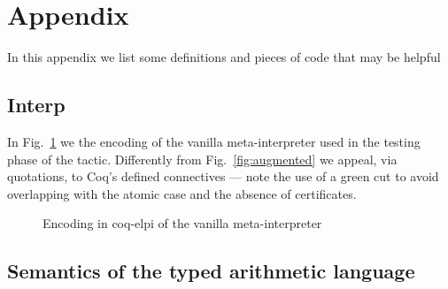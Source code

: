 
\section{Appendix}
\label{sec:app}

In this appendix we list some definitions and pieces of code that may be helpful

\subsection{Interp}


In Fig.~\ref{fig:interp} we the encoding of the vanilla meta-interpreter used in
the testing phase of the  tactic. Differently from Fig.~\ref{fig:augmented} we appeal, via quotations, to Coq's defined connectives --- note the use of a green cut to avoid overlapping with the  atomic case and the absence of certificates.

\begin{figure}
 

\caption{Encoding in coq-elpi of the vanilla meta-interpreter}
\label{fig:interp}
%
%
\end{figure}

\subsection{Semantics of the typed arithmetic language}
\label{ssec:types}

